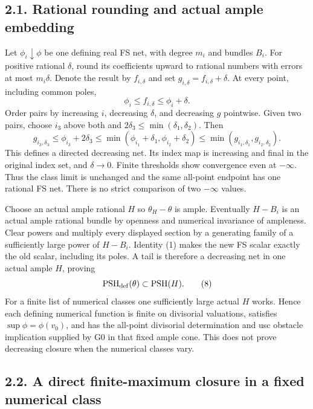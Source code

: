 \documentclass[
  10pt,
]{article}
\begin{document}
\subsection{2.1. Rational rounding and actual ample
embedding}\label{rational-rounding-and-actual-ample-embedding}

Let \(\phi_i\downarrow\phi\) be one defining real FS net, with degree
\(m_i\) and bundles \(B_i\). For positive rational \(\delta\), round its
coefficients upward to rational numbers with errors at most
\(m_i\delta\). Denote the result by \(f_{i,\delta}\) and set
\(g_{i,\delta}=f_{i,\delta}+\delta\). At every point, including common
poles, \[\phi_i\leq f_{i,\delta}\leq\phi_i+\delta.\tag{6}\] Order pairs
by increasing \(i\), decreasing \(\delta\), and decreasing \(g\)
pointwise. Given two pairs, choose \(i_3\) above both and
\(2\delta_3\leq\min(\delta_1,\delta_2)\). Then
\[g_{i_3,\delta_3}\leq\phi_{i_3}+2\delta_3
\leq\min(\phi_{i_1}+\delta_1,\phi_{i_2}+\delta_2)
\leq\min(g_{i_1,\delta_1},g_{i_2,\delta_2}).\tag{7}\] This defines a
directed decreasing net. Its index map is increasing and final in the
original index set, and \(\delta\to0\). Finite thresholds show
convergence even at \(-\infty\). Thus the class limit is unchanged and
the same all-point endpoint has one rational FS net. There is no strict
comparison of two \(-\infty\) values.

Choose an actual ample rational \(H\) so \(\theta_H-\theta\) is ample.
Eventually \(H-B_i\) is an actual ample rational bundle by openness and
numerical invariance of ampleness. Clear powers and multiply every
displayed section by a generating family of a sufficiently large power
of \(H-B_i\). Identity (1) makes the new FS scalar exactly the old
scalar, including its poles. A tail is therefore a decreasing net in one
actual ample \(H\), proving
\[\operatorname{PSH}_{\rm def}(\theta)\subset\operatorname{PSH}(H).\tag{8}\]
For a finite list of numerical classes one sufficiently large actual
\(H\) works. Hence each defining numerical function is finite on
divisorial valuations, satisfies \(\sup\phi=\phi(v_0)\), and has the
all-point divisorial determination and usc obstacle implication supplied
by G0 in that fixed ample cone. This does not prove decreasing closure
when the numerical classes vary.

\subsection{2.2. A direct finite-maximum closure in a fixed numerical
class}\label{a-direct-finite-maximum-closure-in-a-fixed-numerical-class}
\end{document}
